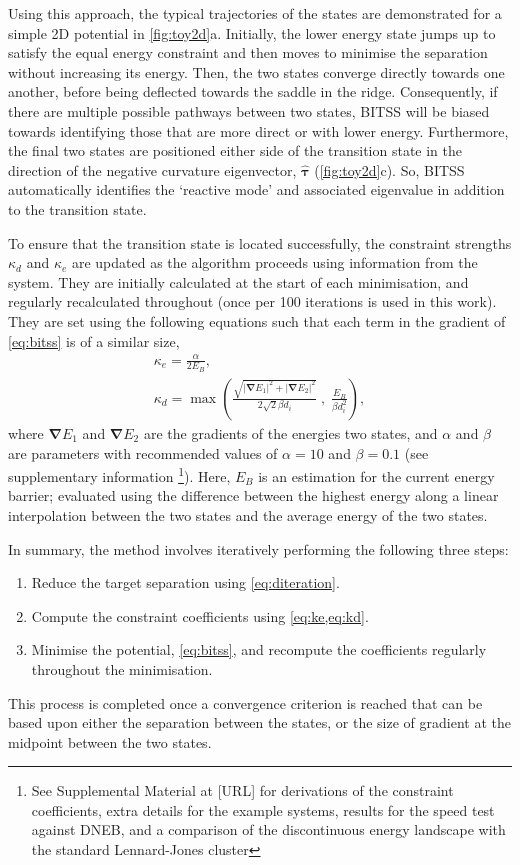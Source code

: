\documentclass[aps,prl,twocolumn,10pt,groupedaddress]{revtex4-2}
\begin{document}
Using this approach, the typical trajectories of the states are demonstrated for a simple 2D potential in \cref{fig:toy2d}a.
Initially, the lower energy state jumps up to satisfy the equal energy constraint and then moves to minimise the separation without increasing its energy.
Then, the two states converge directly towards one another, before being deflected towards the saddle in the ridge.
Consequently, if there are multiple possible pathways between two states, BITSS will be biased towards identifying those that are more direct or with lower energy.
Furthermore, the final two states are positioned either side of the transition state in the direction of the negative curvature eigenvector, $\bm{\hat{\tau}}$ (\cref{fig:toy2d}c).
So, BITSS automatically identifies the `reactive mode' and associated eigenvalue in addition to the transition state.

To ensure that the transition state is located successfully, the constraint strengths $\kappa_d$ and $\kappa_e$ are updated as the algorithm proceeds using information from the system.
They are initially calculated at the start of each minimisation, and regularly recalculated throughout (once per 100 iterations is used in this work).
They are set using the following equations such that each term in the gradient of \cref{eq:bitss} is of a similar size,
\begin{gather}
  \kappa_e = \frac {\alpha} {2 E_B},
  \label{eq:ke}
  \\
  \kappa_d = \max \left(
    \frac {\sqrt{|\bm{\nabla} E_1|^2 + |\bm{\nabla} E_2|^2}} {2\sqrt{2} \beta d_i} \; , \;
    \frac{E_B}{\beta d_i^2} \right),
  \label{eq:kd}
\end{gather}
where $\bm{\nabla} E_1$ and $\bm{\nabla} E_2$ are the gradients of the energies two states, and $\alpha$ and $\beta$ are parameters with recommended values of $\alpha = 10$ and $\beta = 0.1$ (see supplementary information \footnote{See Supplemental Material at [URL] for derivations of the constraint coefficients, extra details for the example systems, results for the speed test against DNEB, and a comparison of the discontinuous energy landscape with the standard Lennard-Jones cluster}).
Here, $E_B$ is an estimation for the current energy barrier; evaluated using the difference between the highest energy along a linear interpolation between the two states and the average energy of the two states.

In summary, the method involves iteratively performing the following three steps:
\begin{enumerate}
  \item Reduce the target separation using \cref{eq:diteration}.
  \item Compute the constraint coefficients using \cref{eq:ke,eq:kd}.
  \item Minimise the potential, \cref{eq:bitss}, and recompute the coefficients regularly throughout the minimisation.
\end{enumerate}
This process is completed once a convergence criterion is reached that can be based upon either the separation between the states, or the size of gradient at the midpoint between the two states.
\end{document}
